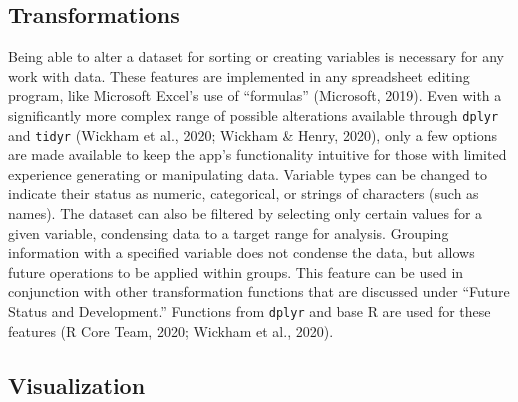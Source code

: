 \documentclass[english,man,floatsintext]{apa6}
\begin{document}
\hypertarget{transformations}{%
\subsection{Transformations}\label{transformations}}

Being able to alter a dataset for sorting or creating variables is necessary for any work with data. These features are implemented in any spreadsheet editing program, like Microsoft Excel's use of \enquote{formulas} (Microsoft, 2019). Even with a significantly more complex range of possible alterations available through \texttt{dplyr} and \texttt{tidyr} (Wickham et al., 2020; Wickham \& Henry, 2020), only a few options are made available to keep the app's functionality intuitive for those with limited experience generating or manipulating data. Variable types can be changed to indicate their status as numeric, categorical, or strings of characters (such as names). The dataset can also be filtered by selecting only certain values for a given variable, condensing data to a target range for analysis. Grouping information with a specified variable does not condense the data, but allows future operations to be applied within groups. This feature can be used in conjunction with other transformation functions that are discussed under \enquote{Future Status and Development.} Functions from \texttt{dplyr} and base R are used for these features (R Core Team, 2020; Wickham et al., 2020).

\hypertarget{visualization}{%
\subsection{Visualization}\label{visualization}}
\end{document}

